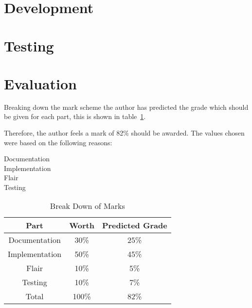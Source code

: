 \documentclass[11pt, a4paper]{article}
\begin{document}
\section{Development}


\section{Testing}


\section{Evaluation}


Breaking down the mark scheme the author has predicted the grade which should 
be given for each part, this is shown in table~\ref{tab:marks}.

Therefore, the author feels a mark of 82\% should be awarded. The values chosen 
were based on the following reasons:

\begin{description}
\item[Documentation] 
\item[Implementation] 
\item[Flair] 
\item[Testing] 
\end{description}

\begin{table}[h]
\centering
\begin{tabular}{|c|c|c|}\hline
\textbf{Part} & \textbf{Worth} & \textbf{Predicted Grade} \\ \hline
Documentation & 30\% & 25\% \\ 
Implementation & 50\% & 45\% \\ 
Flair & 10\% & 5\% \\ 
Testing & 10\% & 7\% \\ \hline
Total & 100\% & 82\% \\ \hline
\end{tabular}
\caption{Break Down of Marks}\label{tab:marks}
\end{table}

\newpage



\end{document}
